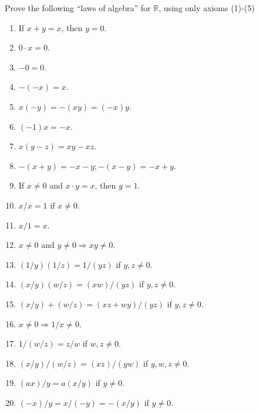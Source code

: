 \begin{exercise}\label{chapter1:section4:exercise1}
    Prove the following ``laws of algebra'' for $\mathbb{R}$, using only axioms {(1)}-{(5)}
    \begin{enumerate}[label={(\alph*)}]
        \item If $x + y = x$, then $y = 0$.
        \item $0\cdot x = 0$.
        \item $-0 = 0$.
        \item $-(-x) = x$.
        \item $x(-y) = -(xy) = (-x)y$.
        \item $(-1)x = -x$.
        \item $x(y - z) = xy - xz$.
        \item $-(x + y) = -x - y; -(x - y) = -x + y$.
        \item If $x\ne 0$ and $x\cdot y = x$, then $y = 1$.
        \item $x/x = 1$ if $x\ne 0$.
        \item $x/1 = x$.
        \item $x\ne 0$ and $y\ne 0\Rightarrow xy\ne 0$.
        \item $(1/y)(1/z) = 1/(yz)$ if $y, z\ne 0$.
        \item $(x/y)(w/z) = (xw)/(yz)$ if $y, z\ne 0$.
        \item $(x/y) + (w/z) = (xz + wy)/(yz)$ if $y, z\ne 0$.
        \item $x\ne 0\Rightarrow 1/x\ne 0$.
        \item $1/(w/z) = z/w$ if $w, z\ne 0$.
        \item $(x/y)/(w/z) = (xz)/(yw)$ if $y, w, z\ne 0$.
        \item $(ax)/y = a(x/y)$ if $y\ne 0$.
        \item $(-x)/y = x/(-y) = -(x/y)$ if $y\ne 0$.
    \end{enumerate}
\end{exercise}

